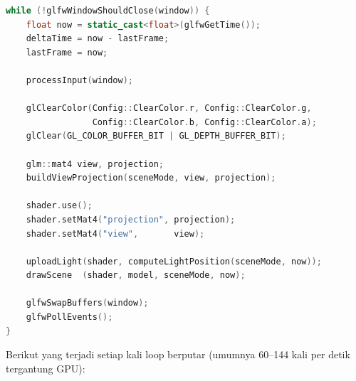 \documentclass[12pt,a4paper]{article}
\begin{document}
\begin{lstlisting}[language=Cpp]
while (!glfwWindowShouldClose(window)) {
    float now = static_cast<float>(glfwGetTime());
    deltaTime = now - lastFrame;
    lastFrame = now;

    processInput(window);

    glClearColor(Config::ClearColor.r, Config::ClearColor.g,
                 Config::ClearColor.b, Config::ClearColor.a);
    glClear(GL_COLOR_BUFFER_BIT | GL_DEPTH_BUFFER_BIT);

    glm::mat4 view, projection;
    buildViewProjection(sceneMode, view, projection);

    shader.use();
    shader.setMat4("projection", projection);
    shader.setMat4("view",       view);

    uploadLight(shader, computeLightPosition(sceneMode, now));
    drawScene  (shader, model, sceneMode, now);

    glfwSwapBuffers(window);
    glfwPollEvents();
}
\end{lstlisting}

Berikut yang terjadi setiap kali loop berputar (umumnya 60--144 kali per detik tergantung GPU):
\end{document}

